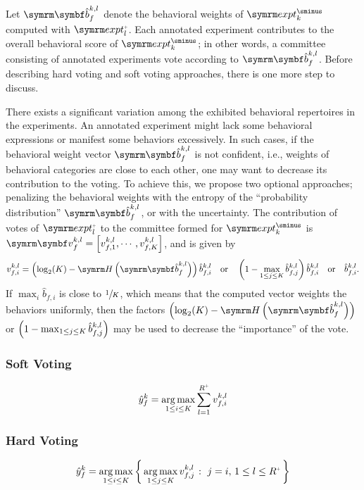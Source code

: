 Let $\V{\hat{b}}_f^{k,l}$ denote the behavioral weights of $\exptUnann_k$ computed with $\exptAnn_l$. Each annotated experiment contributes to the overall behavioral score of $\exptUnann_k$; in other words, a committee consisting of annotated experiments vote according to $\V{\hat{b}}_f^{k,l}$. Before describing hard voting and soft voting approaches, there is one more step to discuss.

There exists a significant variation among the exhibited behavioral repertoires in the experiments.
An annotated experiment might lack some behavioral expressions or manifest some behaviors excessively.
In such cases, if the behavioral weight vector $\V{\hat{b}}_f^{k,l}$ is not confident, i.e., weights of behavioral categories are close to each other, one may want to decrease its contribution to the voting.
To achieve this, we propose two optional approaches; penalizing the behavioral weights with the entropy of the ``probability distribution'' $\V{\hat{b}}_f^{k,l}$, or with the uncertainty.
The contribution of votes of $\exptAnn_l$ to the committee formed for $\exptUnann_k$ is $\V{v}_f^{k,l} = \qmatrix{v_{f,1}^{k,l}, \cdots, v_{f,K}^{k,l}}$, and is given by
\begin{equation}
	v_{f,i}^{k,l} = \rbr{\log_2(K) - \entropy{\V{\hat{b}}_f^{k,l}}} \hat{b}_{f,i}^{k,l} \qbor \rbr{ 1 - \max_{1 \leq j \leq K} \hat{b}_{f,j}^{k,l}} \hat{b}_{f,i}^{k,l} \qbor \hat{b}_{f,i}^{k,l}.
\end{equation}
If $\max_i \hat{b}_{f,i}$ is close to $\sfrac{1}{K}$, which means that the computed vector weights the behaviors uniformly, then the factors $\rbr{\log_2(K) - \entropy{\V{\hat{b}}_f^{k,l}}}$ or $\left( 1 - \max_{1 \leq j \leq K} \hat{b}_{f,j}^{k,l}\right)$ may be used to decrease the ``importance'' of the vote.

\subsubsection{Soft Voting}
\begin{equation}
	\hat{y}^k_f = \argmax_{1 \leq i \leq K} \sum_{l=1}^{\Ann{R}} v_{f,i}^{k,l}
\end{equation}

\subsubsection{Hard Voting}
\begin{equation}
	\hat{y}^k_f = \argmax_{1 \leq i \leq K} \Set{\argmax_{1 \leq j \leq K} v_{f,j}^{k,l}}{j=i, \, 1 \leq l \leq \Ann{R}}
\end{equation}